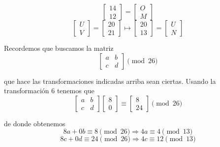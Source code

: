 \documentclass[letterpaper,11pt]{article}
\begin{document}
\begin{enumerate}
\begin{enumerate}
\begin{equation*}
            \begin{bmatrix} 14 \\ 12 \end{bmatrix} =
            \begin{bmatrix} O \\ M \end{bmatrix}
        \end{equation*}
        \begin{equation*}
            \begin{bmatrix} U \\ V \end{bmatrix} =
            \begin{bmatrix} 20 \\ 21 \end{bmatrix} \mapsto
            \begin{bmatrix} 20 \\ 13 \end{bmatrix} =
            \begin{bmatrix} U \\ N \end{bmatrix}
        \end{equation*}
        
        Recordemos que buscamos la matriz
        \begin{equation*}
            \begin{bmatrix} a & b \\ c & d \end{bmatrix}  \pmod{26}
        \end{equation*}

        que hace las transformaciones indicadas arriba sean ciertas. Usando
        la transformación $6$ tenemos que
        \begin{equation*}
            \begin{bmatrix} a & b \\ c & d \end{bmatrix}
            \begin{bmatrix} 8 \\ 0 \end{bmatrix} \equiv
            \begin{bmatrix} 8 \\ 24 \end{bmatrix} \pmod{26}
        \end{equation*}
        
        de donde obtenemos
        \begin{equation*}
            8a + 0b \equiv 8 \pmod{26} \Rightarrow 4a \equiv 4 \pmod{13}
        \end{equation*}
        \begin{equation*}
            8c + 0d \equiv 24 \pmod{26} \Rightarrow 4c \equiv 12 \pmod{13}
        \end{equation*}


\end{enumerate}
\end{enumerate}
\end{document}
